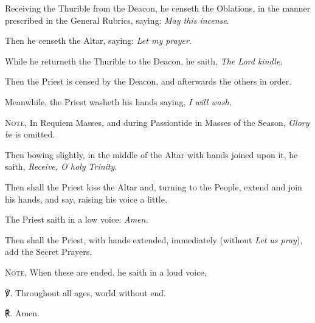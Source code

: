 \begin{multicols}{2}
\begin{rubric}
\end{rubric}
\begin{rubric}
    Receiving the Thurible from the Deacon, he censeth the Oblations, in the manner prescribed in the General Rubrics, saying: \emph{May this incense}.\par
    Then he censeth the Altar, saying: \emph{Let my prayer}.\par
    While he returneth the Thurible to the Deacon, he saith, \emph{The Lord kindle}.\par
    Then the Priest is censed by the Deacon, and afterwards the others in order.
\end{rubric}
\begin{rubric}
    Meanwhile, the Priest washeth his hands saying, \emph{I will wash}.\par
    \textsc{Note,} In Requiem Masses, and during Passiontide in Masses of the Season, \emph{Glory be} is omitted.
\end{rubric}
\begin{rubric}
    Then bowing slightly, in the middle of the Altar with hands joined upon it, he saith, \emph{Receive, O holy Trinity}.
\end{rubric}
\end{multicols}
\begin{rubric}
    Then shall the Priest kiss the Altar and, turning to the People, extend and join his hands, and say, raising his voice a little,
\end{rubric}
\begin{rubric}
    The Priest saith in a low voice: \emph{Amen.}
\end{rubric}
\begin{rubric}
	Then shall the Priest, with hands extended, immediately (without \emph{Let us pray}), add the Secret Prayers.\par
	\textsc{Note,} When these are ended, he saith in a loud voice,
\end{rubric}
℣. Throughout all ages, world without end.\par
℟. Amen.

